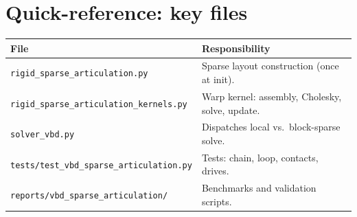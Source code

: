 \documentclass[11pt,a4paper]{article}
\begin{document}
\section{Quick-reference: key files}

\begin{center}
\begin{tabular}{p{7.5cm}p{6cm}}
\toprule
File & Responsibility \\
\midrule
\texttt{rigid\_sparse\_articulation.py} &
  Sparse layout construction (once at init). \\
\texttt{rigid\_sparse\_articulation\_kernels.py} &
  Warp kernel: assembly, Cholesky, solve, update. \\
\texttt{solver\_vbd.py} &
  Dispatches local vs.\ block-sparse solve. \\
\texttt{tests/test\_vbd\_sparse\_articulation.py} &
  Tests: chain, loop, contacts, drives. \\
\texttt{reports/vbd\_sparse\_articulation/} &
  Benchmarks and validation scripts. \\
\bottomrule
\end{tabular}
\end{center}
\end{document}
